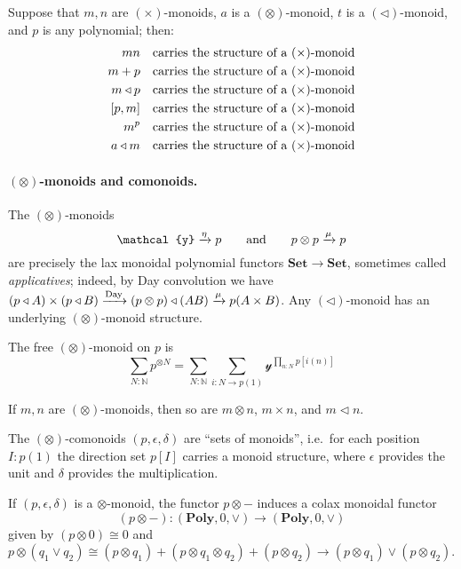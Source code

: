 \documentclass[11pt, one side, article]{memoir}
\theoremstyle{definition}
\theoremstyle{plain}
\newcommand{\Cat}[1]{\mathbf{#1}}%
\newcommand{\To}[2][]{\xrightarrow[#1]{\tn{$#2$}}}
\newcommand{\tn}[1]{\textnormal{#1}}
\newcommand{\nn}{\mathbb{N}}
\newcommand{\smset}{\Cat{Set}}
\newcommand{\yon}{{\mathcal{y}}}
\newcommand{\poly}{\Cat{Poly}}
\newcommand{\0}{\textsf{0}}
\newcommand{\1}{\tn{\textsf{1}}}
\newcommand{\tri}{\mathbin{\triangleleft}}
\newcommand{\hh}[2][]{#1 \tn{#2} #1}
\newcommand{\qqand}{\hh[\qquad]{and}}
\begin{document}
Suppose that $m,n$ are $(\times)$-monoids, $a$ is a $(\otimes)$-monoid, $t$ is a $(\tri)$-monoid, and $p$ is any polynomial; then:
\begin{align}
	mn&\quad\tn{carries the structure of a $(\times)$-monoid}\\
	m+p&\quad\tn{carries the structure of a $(\times)$-monoid}\\
	m\tri p&\quad\tn{carries the structure of a $(\times)$-monoid}\\
	[p,m]&\quad\tn{carries the structure of a $(\times)$-monoid}\\
	m^p&\quad\tn{carries the structure of a $(\times)$-monoid}\\
	a\tri m&\quad\tn{carries the structure of a $(\times)$-monoid}
\end{align}


\paragraph{$(\otimes)$-monoids and comonoids.}
The $(\otimes)$-monoids
\begin{equation}\label{eqn.otimes_monoids}
	\yon\To{\eta} p
	\qqand
	p\otimes p\To{\mu} p
\end{equation}
are precisely the lax monoidal polynomial functors $\smset\to\smset$, sometimes called \emph{applicatives}; indeed, by Day convolution we have $(p\tri A)\times (p\tri B)\To{\text{Day}} (p\otimes p)\tri(AB)\To{\mu}p(A\times B)$. Any $(\tri)$-monoid has an underlying $(\otimes)$-monoid structure.

The free $(\otimes)$-monoid on $p$ is
\begin{equation}
	\sum_{N:\nn}p^{\otimes N}=\sum_{N:\nn}\sum_{i\colon N\to p(1)}\yon^{\prod_{n:N}p[i(n)]}
\end{equation}

If $m,n$ are $(\otimes)$-monoids, then so are $m\otimes n$, $m\times n$, and $m\tri n$. 

The $(\otimes)$-comonoids $(p,\epsilon,\delta)$ are ``sets of monoids'', i.e.\ for each position $I:p(1)$ the direction set $p[I]$ carries a monoid structure, where $\epsilon$ provides the unit and $\delta$ provides the multiplication.

If $(p,\epsilon,\delta)$ is a $\otimes$-monoid, the functor $p\otimes-$ induces a colax monoidal functor
\begin{equation}
	(p\otimes -)\colon(\poly,0,\vee)\to(\poly,0,\vee)
\end{equation}
given by $(p\otimes 0)\cong0$ and $p\otimes (q_1\vee q_2)\cong(p\otimes q_1)+(p\otimes q_1\otimes q_2)+(p\otimes q_2)\to(p\otimes q_1)\vee(p\otimes q_2)$.
\end{document}

